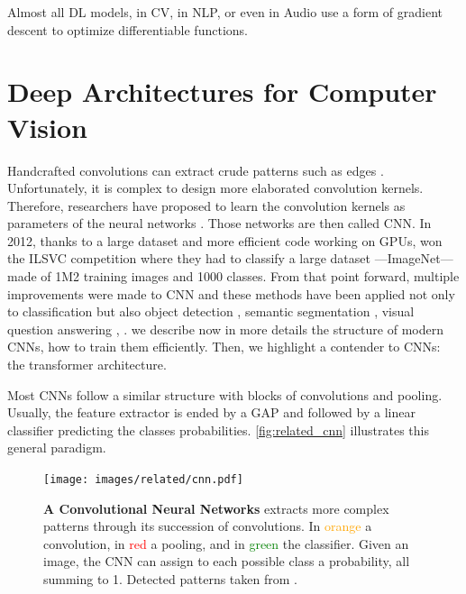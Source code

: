 Almost all \ac{DL} models, in \ac{CV}, in \ac{NLP}, or even in Audio use a form of gradient descent to
optimize differentiable functions.

\section{Deep Architectures for Computer Vision}

Handcrafted convolutions can extract crude patterns such as edges \citep{lowe1999sift}. Unfortunately,
it is complex to design more elaborated convolution kernels. Therefore, researchers have proposed to
learn the convolution kernels as parameters of the neural networks
\citep{fukushima1980neocognitron,lecun1999lenet}. Those networks are then called \acf{CNN}. In 2012,
thanks to a large dataset and more efficient code working on \acp{GPU}, \cite{krizhevsky2012alexnet}
won the ILSVC competition \citep{russakovsky2015imagenet_ilsvrc} where they had to classify a large
dataset ---ImageNet--- made of 1M2 training images and 1000 classes. From that point forward,
multiple improvements were made to \ac{CNN} \citep{ioffe2015batchnorm,he2016resnet} and these
methods have been applied not only to classification but also object detection
\citep{ren20fasterrcnn}, semantic segmentation \citep{chen2018deeplab}, visual question answering
\citep{benyounes2017mutan}, \etc. we describe now in more details the structure of modern
\acp{CNN}, how to train them efficiently. Then, we highlight a contender to \acp{CNN}: the
transformer architecture.

Most \acp{CNN} follow a similar structure with blocks of convolutions and pooling. Usually, the
feature extractor is ended by a \acf{GAP} and followed by a linear classifier
predicting the classes probabilities. \autoref{fig:related_cnn} illustrates this general paradigm.

\begin{figure}[tb]
      \begin{center}
            \texttt{[image: images/related/cnn.pdf]}
      \end{center}
      \caption{\textbf{A Convolutional Neural Networks} extracts more complex patterns through its
            succession of convolutions. In \textcolor{orange}{orange} a convolution, in \textcolor{red}{red}
            a pooling, and in \textcolor{green}{green} the classifier. Given an image, the \ac{CNN} can assign to
            each possible class a probability, all summing to 1.
            Detected patterns taken from \cite{olah2017feature}.}
      \label{fig:related_cnn}
\end{figure}


